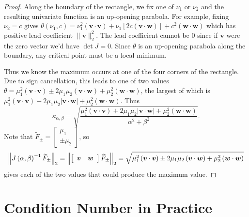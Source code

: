 \documentclass[3p, authoryear, square]{elsarticle}
\theoremstyle{definition}
\begin{document}
\begin{proof}
Along the boundary of the rectangle,
we fix one of \(\nu_1\) or \(\nu_2\) and the resulting univariate function is
an up-opening parabola. For example, fixing \(\nu_2 = c\) gives
\(\theta(\nu_1, c) =
\nu_1^2 \left(\bm{v} \cdot \bm{v}\right) +
\nu_1\left[2 c \left(\bm{v} \cdot \bm{w}\right)\right] +
c^2 \left(\bm{w} \cdot \bm{w}\right)\) which has positive lead coefficient
\(\|\bm{v}\|_2^2\). The lead coefficient cannot be \(0\) since if \(\bm{v}\)
were the zero vector we'd have \(\det J = 0\).
Since \(\theta\) is an up-opening parabola along the boundary, any critical
point must be a local minimum.

Thus we know the maximum occurs at one of the four corners of the
rectangle. Due to sign cancellation, this leads to one of two values
\(\theta =
\mu_1^2 \left(\bm{v} \cdot \bm{v}\right) \pm
2 \mu_1 \mu_2 \left(\bm{v} \cdot \bm{w}\right) +
\mu_2^2 \left(\bm{w} \cdot \bm{w}\right)\), the largest of which is
\(\mu_1^2 \left(\bm{v} \cdot \bm{v}\right) +
2 \mu_1 \mu_2 \left|\bm{v} \cdot \bm{w}\right| +
\mu_2^2 \left(\bm{w} \cdot \bm{w}\right)\). Thus
\begin{equation}\label{eq:intersect-cond-num-too}
\kappa_{\alpha, \beta} = \sqrt{\frac{\mu_1^2
  \left(\bm{v} \cdot \bm{v}\right) +
  2 \mu_1 \mu_2 \left|\bm{v} \cdot \bm{w}\right| +
  \mu_2^2 \left(\bm{w} \cdot \bm{w}\right)}{\alpha^2 + \beta^2}}.
\end{equation}
Note that \(\widetilde{F}_{\pm} = \left[ \begin{array}{c} \mu_1 \\ \pm \mu_2
\end{array}\right]\), so
\begin{equation}
\left \lVert J\left(\alpha, \beta\right)^{-1} \widetilde{F}_{\pm}
  \right \rVert_2 = \left \lVert \left[ \begin{array}{c c} \bm{v} & \bm{w}
  \end{array}\right] \widetilde{F}_{\pm} \right \rVert_2 =
  \sqrt{\mu_1^2 \left(\bm{v} \cdot \bm{v}\right) \pm
  2 \mu_1 \mu_2 \left(\bm{v} \cdot \bm{w}\right) +
  \mu_2^2 \left(\bm{w} \cdot \bm{w}\right)}
\end{equation}
gives each of the two values that could produce the maximum value.
\end{proof}

\section{Condition Number in Practice}
\end{document}
